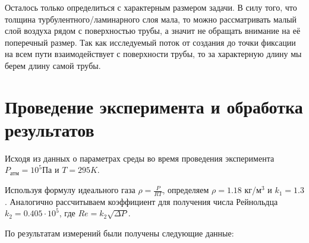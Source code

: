 \documentclass[12pt,a4paper]{article}
\begin{document}
Осталось только определиться с характерным размером задачи. В силу того, что толщина турбулентного/ламинарного слоя мала, то можно рассматривать малый слой воздуха рядом с поверхностью трубы, а значит не обращать внимание на её поперечный размер. Так как исследуемый поток от создания до точки фиксации на всем пути взаимодействует с поверхности трубы, то за характерную длину мы берем  длину самой трубы. 

\section{ Проведение эксперимента и обработка результатов}
Исходя из данных о параметрах среды во время проведения эксперимента $P_{атм}=10^5 $Па и $T=295K$.

Используя формулу идеального газа $\rho=\frac{P}{RT}$, определяем $\rho=1.18$ кг/м$^3$ и $k_1=1.3$. Аналогично рассчитываем коэффициент для получения числа Рейнольдца $k_2=0.405\cdot10^5$, где $Re=k_2\sqrt{\Delta P}$.

По результатам измерений были получены следующие данные:

\begin{table}[H]
    \centering
    \caption{Зависимость параметров от напряжения}
    \label{tab:voltage_dep}
\end{table}
\end{document}
